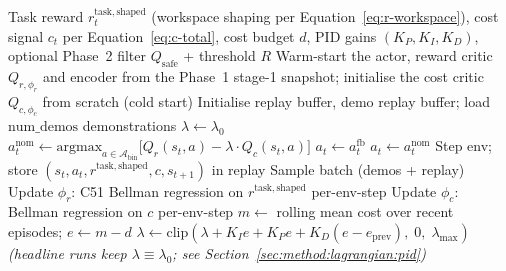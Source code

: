 \documentclass[11pt,a4paper]{report}
\begin{document}
\begin{algorithm}[htbp]
\caption{Value-based Lagrangian constrained-RL training loop
(headline: Option~B-value-mean).}
\label{alg:constrained-rl}
\begin{algorithmic}[1]
\Require Task reward $r^{\mathrm{task,shaped}}_t$ (workspace shaping
  per Equation~\ref{eq:r-workspace}), cost signal $c_t$ per
  Equation~\ref{eq:c-total}, cost budget $d$, PID gains
  $(K_P, K_I, K_D)$, optional Phase~2 filter $Q_{\mathrm{safe}}$ +
  threshold $R$
\State Warm-start the actor, reward critic $Q_{r,\phi_r}$ and
  encoder from the Phase~1 stage-1 snapshot; initialise the cost
  critic $Q_{c,\phi_c}$ from scratch (cold start)
\State Initialise replay buffer, demo replay buffer; load
  $\text{num\_demos}$ demonstrations
\State $\lambda \leftarrow \lambda_0$ 
  \State $a^{\mathrm{nom}}_t \leftarrow \mathrm{argmax}_{a \in
  \mathcal{A}_{\mathrm{bin}}}\!\big[Q_r(s_t,a) - \lambda \cdot
  Q_c(s_t,a)\big]$
    \State $a_t \leftarrow a^{\mathrm{fb}}_t$ 
  \Else
    \State $a_t \leftarrow a^{\mathrm{nom}}_t$
  \EndIf
  \State Step env; store $(s_t, a_t, r^{\mathrm{task,shaped}}, c,
    s_{t+1})$ in replay
  \State Sample batch (demos + replay)
  \State Update $\phi_r$: C51 Bellman regression on
    $r^{\mathrm{task,shaped}}$ per-env-step
  \State Update $\phi_c$: Bellman regression on $c$ per-env-step
    \State $m \leftarrow$ rolling mean cost over recent episodes;
      \quad $e \leftarrow m - d$
    \State $\lambda \leftarrow \mathrm{clip}(\lambda + K_I e
      + K_P e + K_D (e - e_{\mathrm{prev}}),\; 0,\; \lambda_{\max})$
  \EndIf
  \Statex \hspace{\algorithmicindent}\textit{(headline runs keep
    $\lambda \equiv \lambda_0$; see
    Section~\ref{sec:method:lagrangian:pid})}
\EndFor
\end{algorithmic}
\end{algorithm}


\end{document}
